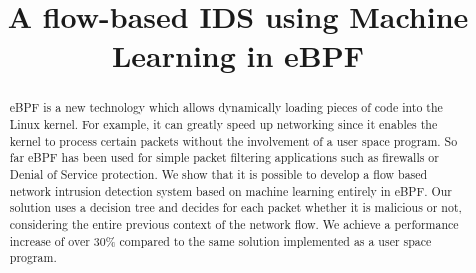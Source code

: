 \documentclass[conference]{IEEEtran}
\begin{document}
\title{A flow-based IDS using Machine Learning in eBPF}

\author{
}





\maketitle%



\begin{abstract}
eBPF is a new technology which allows dynamically loading pieces of code into the Linux kernel. For example, it can greatly speed up networking since it enables the kernel to process certain packets without the involvement of a user space program. So far eBPF has been used for simple packet filtering applications such as firewalls or Denial of Service protection. We show that it is possible to develop a flow based network intrusion detection system based on machine learning entirely in eBPF. Our solution uses a decision tree and decides for each packet whether it is malicious or not, considering the entire previous context of the network flow. We achieve a performance increase of over 30\% compared to the same solution implemented as a user space program. 
\end{abstract}
\end{document}
